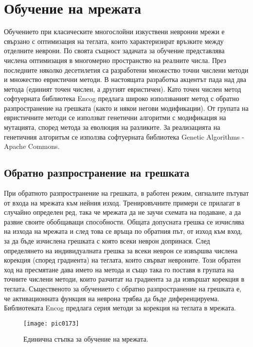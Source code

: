 \newpage
\chapter{Обучение на мрежата}
\label{chapter07}

Обучението при класическите многослойни изкуствени невронни мрежи е свързано с оптимизация на теглата, които характеризират връзките между отделните неврони. По своята същност задачата за обучение представлява числена оптимизация в многомерно пространство на реалните числа. През последните няколко десетилетия са разработени множество точни числени методи и множество евристични методи. В настоящата разработка акцентът пада над два метода (единият точен числен, а другият евристичен). Като точен числен метод софтуерната библиотека Encog предлага широко използваният метод с обратно разпространение на грешката (както и някои негови модификации). От групата на евристичните методи се използват генетични алгоритми с модификация на мутацията, според метода за еволюция на разликите. За реализацията на генетичния алгоритъм се използва софтуерната библиотека Genetic Algorithms - Apache Commons.

\section{Обратно разпространение на грешката}

При обратното разпространение на грешката, в работен режим, сигналите пътуват от входа на мрежата към нейния изход. Тренировъчните примери се прилагат в случайно определен ред, така че мрежата да не заучи схемата на подаване, а да развие своите обобщаващи способности. Общата допусната грешка се изчислява на изхода на мрежата и след това се връща по обратния път, от изход към вход, за да бъде изчислена грешката с която всеки неврон допринася. След определянето на индивидуалната грешка за всеки неврон се извършва числена корекция (според градиента) на теглата, които свърват невроните. Този обратен ход на пресмятане дава името на метода и също така го поставя в групата на точните числени методи, които разчитат на градиента за да извършат корекция в теглата. Същественото за обучението с обратно разпространение на грешката е, че активационната функция на неврона трябва да бъде диференцируема. Библиотеката Encog предлага серия методи за корекция на теглата в мрежата. 

\begin{figure}[h]
  \centering
  \texttt{[image: pic0173]}
  \caption{Единична стъпка за обучение на мрежата.}
\label{fig:pic0173}
\end{figure}
\FloatBarrier

